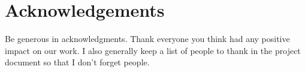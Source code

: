 \section*{Acknowledgements}

Be generous in acknowledgments. 
Thank everyone you think 
had any 
positive impact 
on our work. 
I also generally keep a list of 
people to thank 
in the project document
so that I don't forget people. 